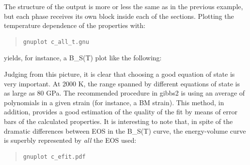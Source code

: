 \documentclass[a4paper]{article}
\begin{document}
The structure of the output is more or less the same as in the
previous example, but each phase receives its own block inside each of
the sections. Plotting the temperature dependence of the properties
with:
%
\begin{quote}
\begin{verbatim}
gnuplot c_all_t.gnu
\end{verbatim}
\end{quote}

yields, for instance, a B\_S(T) plot like the following:

\noindent{}

Judging from this picture, it is clear that choosing a good equation
of state is very important. At 2000 K, the range spanned by different
equations of state is as large as 80 GPa. The recommended procedure in
gibbs2 is using an average of polynomials in a given strain (for
instance, a BM strain). This method, in addition, provides a good
estimation of the quality of the fit by means of error bars of the
calculated properties. It is interesting to note that, in spite of the
dramatic differences between EOS in the B\_S(T) curve, the
energy-volume curve is superbly represented by \emph{all} the EOS used:
%
\begin{quote}
\begin{verbatim}
gnuplot c_efit.pdf
\end{verbatim}
\end{quote}
\end{document}
